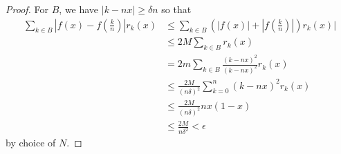 \documentclass[12pt, a4paper]{book}
\theoremstyle{nonumberplain}
\newtheorem{proof}{Proof}
\begin{document}
\begin{proof}
    For $B$, we have $|k-nx|\geq\delta n$ so that
    \begin{align*}
        \sum\limits_{k\in B}\left\lvert f(x)-f\left(\frac{k}{n}\right)\right\rvert r_k(x) &\leq \sum\limits_{k\in B}\left(|f(x)|+\left\lvert f\left(\frac{k}{n}\right)\right\rvert\right)r_k(x)|\\
                                                                             &\leq 2M\sum\limits_{k\in B}r_k(x)\\
                                                                             &= 2m\sum\limits_{k\in B}\frac{(k-nx)^2}{(k-nx)^2}r_k(x)\\
                                                                             &\leq\frac{2M}{(n\delta)^2}\sum\limits_{k=0}^n(k-nx)^2r_k(x)\\
                                                                             &\leq\frac{2M}{(n\delta)^2}nx(1-x)\\
                                                                             &\leq\frac{2M}{n\delta^2}<\epsilon
    \end{align*}
    by choice of $N$.
\end{proof}
\end{document}
